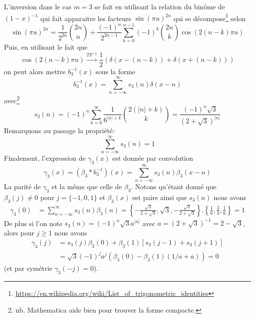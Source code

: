 \documentclass[11pt,twoside]{article}
\newcommand{\nn}{\nonumber}
\begin{document}
L'inversion dans le cas $m=3$ se fait en utilisant la relation du binôme de $(1-x)^{-1}$ qui fait apparaitre les facteurs  $\sin(\pi u)^{2n}$ qui se décompose\footnote{\url{https://en.wikipedia.org/wiki/List_of_trigonometric_identities}} selon
\begin{equation}
\sin(\pi u)^{2n} = \frac{1}{2^{2n}}\binom{2n}{n}+\frac{(-1)^n}{2^{2n-1}}\sum_{k=0}^{n-1} (-1)^k \binom{2n}{k}\cos(2(n-k)\pi u)
\end{equation}
Puis, en utilisant le fait que 
\begin{equation}
\cos(2(n-k)\pi u) \xrightarrow[]{TF^{-1}} \frac{1}{2}(\delta(x-(n-k))+\delta(x+(n-k)))
\end{equation}
on peut alors mettre $b^{-1}_3(x)$ sous la forme
\begin{equation}
b^{-1}_3(x) = \sum_{n=-\infty}^\infty s_3(n) \delta(x-n)
\end{equation}
avec\footnote{nb. Mathematica aide bien pour trouver la forme compacte.}
\begin{equation}
s_3(n) = (-1)^n \sum_{k=0}^\infty \frac{1}{6^{|n|+k}} \binom{2(|n|+k)}{k} =  \frac{(-1)^n\sqrt{3}}{(2+\sqrt{3})^{|n|}}
\end{equation}
Remarquons au passage la propriété:
\begin{equation}
\sum_{n=-\infty}^\infty s_3(n) = 1
\end{equation} 
Finalement, l'expression de $\gamma_3(x)$  est donnée par convolution
\begin{equation}
\gamma_3(x) = (\beta_3 \ast b^{-1}_3)(x) =  \sum_{n=-\infty}^\infty s_3(n) \beta_3(x-n)
\label{eq:gam3}
\end{equation}
La parité de $\gamma_3$ et la même que celle de $\beta_3$. Notons qu'étant donné que $\beta_3(j)\neq 0$ pour $j=\{-1,0,1\}$ et $\beta_3(x)$ est paire ainsi que $s_3(n)$ nous avons
\begin{align}
\gamma_3(0) &=\sum_{n=-\infty}^\infty s_3(n) \beta_3(n)
= \left\{-\frac{\sqrt{3}}{2+\sqrt{3}},\sqrt{3},-\frac{\sqrt{3}}{2+\sqrt{3}}\right\}.\left\{\frac{1}{6},\frac{2}{3},\frac{1}{6}\right\} = 1
\label{eq:gamma30}
\end{align}
De plus si l'on note $s_3(n)=(-1)^n\sqrt{3}a^{|n|}$ avec $a=(2+\sqrt{3})^{-1}=2-\sqrt{3}$, alors pour $j\geq 1$ nous avons
\begin{align}
\gamma_3(j) &= s_3(j)\beta_3(0) + \beta_3(1)[s_3(j-1)+s_3(j+1)]\nn \\
&= \sqrt{3} (-1)^j a^j (\beta_3(0)-\beta_3(1)(1/a+a)) = 0
\end{align}
(et par symétrie $\gamma_3(-j)=0$).  
\end{document}
